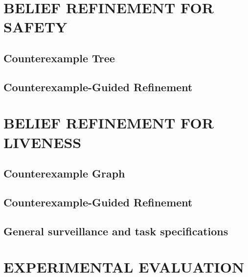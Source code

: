 \documentclass[letterpaper, 10 pt, conference]{ieeeconf}  %
\begin{document}




\section{BELIEF REFINEMENT FOR SAFETY}%
\subsection{Counterexample Tree}

\subsection{Counterexample-Guided Refinement}



\section{BELIEF REFINEMENT FOR LIVENESS}%
\subsection{Counterexample Graph}

\subsection{Counterexample-Guided Refinement}

\subsection{General surveillance and task specifications}



\section{EXPERIMENTAL EVALUATION}\label{sec:experiments}


\end{document}
